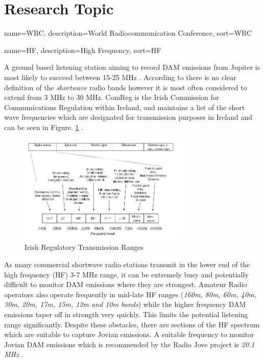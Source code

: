\documentclass[runningheads,a4paper]{llncs}
\begin{document}
%
%
\newpage
\section*{Research Topic}
%

%
{
  name={WRC},
  description={World Radiocommunication Conference},
  sort=WRC
}
%

%
{
  name={HF},
  description={High Frequency},
  sort=HF
}
%

A ground based listening station aiming to record \gls{DAM} emissions from Jupiter is most likely to succeed between 15-25 MHz \citep{wilkinson94}. According to \cite{arrl-00} there is no clear definition of the \textit{shortwave} radio bands however it is most often considered to extend from 3 MHz to 30 MHz. ComReg is the Irish Commission for Communications Regulation within Ireland, and maintains a list of the short wave frequencies which are designated for transmission purposes in Ireland and can be seen in Figure. \ref{fig:irish_electromagnetic_transmission_ranges} \citep{comreg14}.

%
\begin{figure}[here]
\centering
\includegraphics[width=8cm]{images/06}
\caption{Irish Regulatory Transmission Ranges \citep{comreg14}}
\label{fig:irish_electromagnetic_transmission_ranges}
\end{figure}
%

As many commercial shortwave radio stations transmit in the lower end of the high frequency (\gls{HF}) 3-7 MHz range, it can be extremely busy and potentially difficult to monitor \gls{DAM} emissions where they are strongest. Amateur Radio operators also operate frequently in mid-late \gls{HF} ranges (\textit{160m, 80m, 60m, 40m, 30m, 20m, 17m, 15m, 12m and 10m bands}) while the higher frequency \gls{DAM} emissions taper off in strength very quickly. This limits the potential listening range significantly. Despite these obstacles, there are sections of the \gls{HF} spectrum which are suitable to capture Jovian emissions. A suitable frequency to monitor Jovian \gls{DAM} emissions which is recommended by the Radio Jove project is \textit{20.1 MHz} \citep{nasa12}. 
\end{document}

